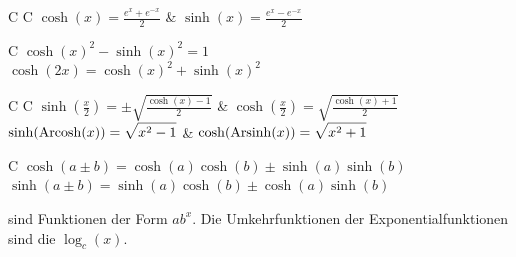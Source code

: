 
\begin{tablebox}
\begin{ZSFtable}[header=false]{C C}
    $\displaystyle \cosh(x) = \frac{e^x + e^{-x}}{2}$ & $\displaystyle \sinh(x) = \frac{e^x - e^{-x}}{2}$ \\ 
\end{ZSFtable}
\end{tablebox}

\begin{tablebox}
\begin{ZSFtable}[header=false]{C}
    $\displaystyle \cosh(x)^2 - \sinh(x)^2 = 1$ \\
    $\displaystyle \cosh(2x) = \cosh(x)^2 + \sinh(x)^2$ \\ 
\end{ZSFtable}
\end{tablebox}

\begin{tablebox}
\begin{ZSFtable}[header=false]{C C}
    $\displaystyle \sinh\left(\frac{x}{2}\right) = \pm\sqrt{\frac{\cosh(x)-1}{2}}$ & $\displaystyle \cosh\left(\frac{x}{2}\right) = \sqrt{\frac{\cosh(x)+1}{2}}$ \\
    $\displaystyle \sinh(\operatorname{Arcosh}(x)) = \sqrt{x^2 - 1}$ & $\displaystyle \cosh(\operatorname{Arsinh}(x)) = \sqrt{x^2 + 1}$ \\
\end{ZSFtable}
\end{tablebox}

\begin{tablebox}[Additionstheoreme]
\begin{ZSFtable}[header=false]{C}
    $\displaystyle \cosh(a \pm b) = \cosh(a)\cosh(b) \pm \sinh(a)\sinh(b)$ \\
    $\displaystyle \sinh(a \pm b) = \sinh(a)\cosh(b) \pm \cosh(a)\sinh(b)$ \\ 
\end{ZSFtable}
\end{tablebox}


 sind Funktionen der Form $a b^x$. Die Umkehrfunktionen der Exponentialfunktionen sind die  $\log_c(x)$.


